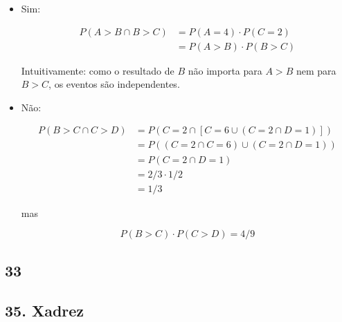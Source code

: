 \documentclass[
  11pt]{report}
\begin{document}
\begin{itemize}
\item
  Sim:

  \[
  \begin{aligned}
  P(A > B \cap B > C) &= P(A = 4) \cdot P(C = 2) \\
  &= P(A > B) \cdot P(B > C)
  \end{aligned}
  \]

  Intuitivamente: como o resultado de $B$ não importa para $A > B$ nem para $B > C$, os eventos são independentes.
\item
  Não:

  \[
  \begin{aligned}
    P(B > C \cap C > D) 
    &= P(C = 2 \cap [C = 6 \cup (C = 2 \cap D = 1)]) \\
    &= P((C = 2 \cap C = 6) \cup (C = 2 \cap D = 1)) \\
    &= P(C = 2 \cap D = 1) \\
    &= 2/3 \cdot 1/2 \\
    &= 1/3
  \end{aligned}
  \]

  mas

  \[
  P(B > C) \cdot P(C > D) = 4/9
  \]
\end{itemize}

\hypertarget{section-19}{%
\subsection*{33}\label{section-19}}

\hypertarget{xadrez}{%
\subsection*{35. Xadrez}\label{xadrez}}
\end{document}
